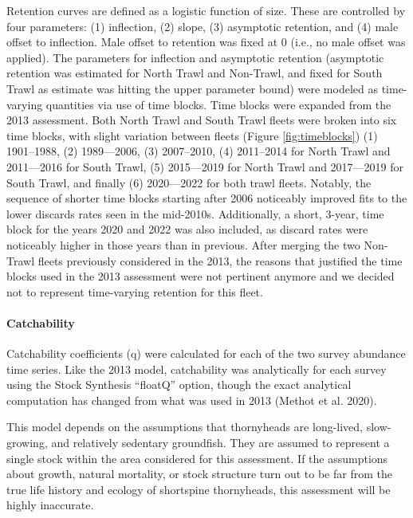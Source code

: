 \documentclass[11pt,
  english,
  letterpaper,
]{article}
\begin{document}
Retention curves are defined as a logistic function of size. These are controlled by four parameters: (1) inflection, (2) slope, (3) asymptotic retention, and (4) male offset to inflection. Male offset to retention was fixed at 0 (i.e., no male offset was applied). The parameters for inflection and asymptotic retention (asymptotic retention was estimated for North Trawl and Non-Trawl, and fixed for South Trawl as estimate was hitting the upper parameter bound) were modeled as time-varying quantities via use of time blocks. Time blocks were expanded from the 2013 assessment. Both North Trawl and South Trawl fleets were broken into six time blocks, with slight variation between fleets (Figure \ref{fig:timeblocks}) (1) 1901--1988, (2) 1989---2006, (3) 2007--2010, (4) 2011--2014 for North Trawl and 2011---2016 for South Trawl, (5) 2015---2019 for North Trawl and 2017---2019 for South Trawl, and finally (6) 2020---2022 for both trawl fleets. Notably, the sequence of shorter time blocks starting after 2006 noticeably improved fits to the lower discards rates seen in the mid-2010s. Additionally, a short, 3-year, time block for the years 2020 and 2022 was also included, as discard rates were noticeably higher in those years than in previous. After merging the two Non-Trawl fleets previously considered in the 2013, the reasons that justified the time blocks used in the 2013 assessment were not pertinent anymore and we decided not to represent time-varying retention for this fleet.

\hypertarget{catchability}{%
\paragraph{Catchability}\label{catchability}}

Catchability coefficients (q) were calculated for each of the two survey abundance time series. Like the 2013 model, catchability was analytically for each survey using the Stock Synthesis ``floatQ'' option, though the exact analytical computation has changed from what was used in 2013 (Methot et al. 2020).

This model depends on the assumptions that thornyheads are long-lived, slow-growing, and relatively sedentary groundfish. They are assumed to represent a single stock within the area considered for this assessment. If the assumptions about growth, natural mortality, or stock structure turn out to be far from the true life history and ecology of shortspine thornyheads, this assessment will be highly inaccurate.
\end{document}
